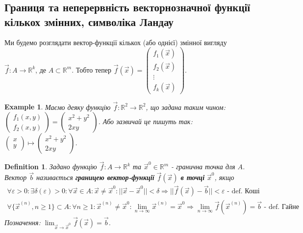 \documentclass[a4paper, 10pt]{article}
\def\huge{\displaystyle}
\theoremstyle{theoremdd}
\theoremstyle{theoremdd}
\theoremstyle{theoremdd}
\newtheorem{definition}[theorem]{Definition}
\theoremstyle{theoremdd}
\theoremstyle{theoremdd}
\newtheorem{example}[theorem]{Example}
\theoremstyle{theoremdd}
\theoremstyle{theoremdd}
\theoremstyle{theoremdd}
\theoremstyle{theoremdd}
\begin{document}
\newpage

\subsection{Границя та неперервність векторнозначної функції кількох змінних, символіка Ландау}
Ми будемо розглядати вектор-функції кількох (або однієї) змінної вигляду $\vec{f}: A \to \mathbb{R}^k$, де $A \subset \mathbb{R}^m$. Тобто тепер $\vec{f}(\vec{x}) = \begin{pmatrix}
f_1(\vec{x}) \\ f_2(\vec{x}) \\ \vdots \\ f_k(\vec{x})
\end{pmatrix}$.

\begin{example}
Маємо деяку функцію $\vec{f}: \mathbb{R}^2 \to \mathbb{R}^2$, що задана таким чином:\\
$\begin{pmatrix}
f_1(x,y) \\
f_2(x,y)
\end{pmatrix} = \begin{pmatrix}
x^2 + y^2 \\ 2xy
\end{pmatrix}$. Або зазвичай це пишуть так: $\begin{pmatrix}
x \\ y
\end{pmatrix} \mapsto \begin{pmatrix}
x^2+y^2 \\ 2xy
\end{pmatrix}$.
\end{example}

\begin{definition}
Задано функцію $\vec{f}: A \to \mathbb{R}^k$ та $\vec{x}^0 \in \mathbb{R}^m$ - гранична точка для $A$.\\
Вектор $\vec{b}$ називається \textbf{границею вектор-функції} $\vec{f}(\vec{x})$ \textbf{в точці} $\vec{x}^0$, якщо
\begin{align*}
\forall \varepsilon > 0: \exists \delta(\varepsilon) > 0: \forall \vec{x} \in A: \vec{x} \neq \vec{x}^0: ||\vec{x} - \vec{x}^0 || < \delta \Rightarrow ||\vec{f}(\vec{x}) - \vec{b}|| < \varepsilon \textrm{ - def. Коші}\\
\forall \{\vec{x}^{(n)}, n \geq 1\} \subset A: \forall n \geq 1: \vec{x}^{(n)} \neq \vec{x}^0: \huge \lim_{n \to \infty} \vec{x}^{(n)} = \vec{x}^0 \Rightarrow \lim_{n \to \infty} \vec{f}(\vec{x}^{(n)}) = \vec{b} \textrm{ - def. Гайне}
\end{align*}
Позначення: $\huge \lim_{\vec{x} \to \vec{x}^0} \vec{f}(\vec{x}) = \vec{b}$.
\end{definition}
\end{document}
